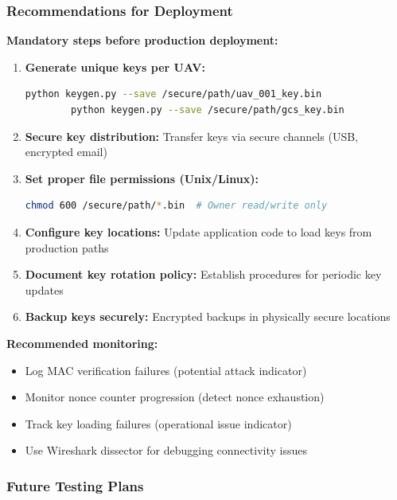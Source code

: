 \documentclass[11pt,a4paper]{article}
\begin{document}
\subsubsection{Recommendations for Deployment}

\textbf{Mandatory steps before production deployment:}
\begin{enumerate}[noitemsep]
	\item \textbf{Generate unique keys per UAV:}
	\begin{lstlisting}[language=bash,basicstyle=\ttfamily\footnotesize]
		python keygen.py --save /secure/path/uav_001_key.bin
		python keygen.py --save /secure/path/gcs_key.bin
	\end{lstlisting}
	
	\item \textbf{Secure key distribution:} Transfer keys via secure channels (USB, encrypted email)
	
	\item \textbf{Set proper file permissions (Unix/Linux):}
	\begin{lstlisting}[language=bash,basicstyle=\ttfamily\footnotesize]
		chmod 600 /secure/path/*.bin  # Owner read/write only
	\end{lstlisting}
	
	\item \textbf{Configure key locations:} Update application code to load keys from production paths
	
	\item \textbf{Document key rotation policy:} Establish procedures for periodic key updates
	
	\item \textbf{Backup keys securely:} Encrypted backups in physically secure locations
\end{enumerate}

\textbf{Recommended monitoring:}
\begin{itemize}[noitemsep]
	\item Log MAC verification failures (potential attack indicator)
	\item Monitor nonce counter progression (detect nonce exhaustion)
	\item Track key loading failures (operational issue indicator)
	\item Use Wireshark dissector for debugging connectivity issues
\end{itemize}

\subsubsection{Future Testing Plans}
\end{document}
